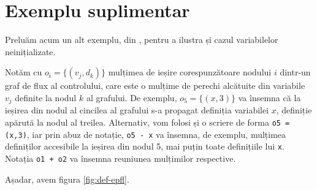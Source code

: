 \section{Exemplu suplimentar}

Preluăm acum un alt exemplu, din \cite{epfl}, pentru a ilustra și cazul
variabilelor ne\-i\-ni\-ți\-a\-li\-za\-te.

Notăm cu $ o_i = \{ (v_j, d_k) \} $ mulțimea de ieșire corespunzătoare
nodului $ i $ dintr-un graf de flux al controlului, care este o mulțime
de perechi alcătuite din variabile $ v_j $ definite la nodul $ k $
al grafului. De exemplu, $ o_5 = \{ (x, 3) \} $ va însemna că la ieșirea
din nodul al cincilea al grafului s-a propagat definiția variabilei $ x $,
definiție apărută la nodul al treilea. Alternativ, vom folosi și o scriere
de forma \texttt{o5 = {(x,3)}}, iar prin abuz de notație, \texttt{o5 - x}
va însemna, de exemplu, mulțimea definiților accesibile la ieșirea din
nodul 5, mai puțin toate definițiile lui \texttt{x}. Notația \texttt{o1 + o2}
va însemna reuniunea mulțimilor respective.

Așadar, avem figura \ref{fig:def-epfl}.

